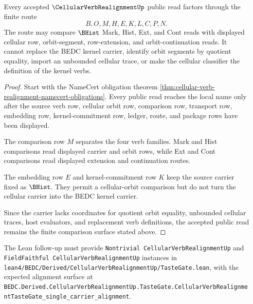\begin{theorem}
\label{thm:cellular-verb-realignment-non-escape-boundary}
Every accepted $\CellularVerbRealignmentUp$ public read factors through the finite route
$$
B,O,M,H,E,K,L,C,P,N.
$$
The route may compare $\BHist$ Mark, Hist, Ext, and Cont reads with displayed cellular row, orbit-segment, row-extension, and orbit-continuation reads. It cannot replace the BEDC kernel carrier, identify orbit segments by quotient equality, import an unbounded cellular trace, or make the cellular classifier the definition of the kernel verbs.
\end{theorem}
\begin{proof}
Start with the NameCert obligation theorem \autoref{thm:cellular-verb-realignment-namecert-obligations}. Every public read reaches the local name only after the source verb row, cellular orbit row, comparison row, transport row, embedding row, kernel-commitment row, ledger, route, and package rows have been displayed.

The comparison row $M$ separates the four verb families. Mark and Hist comparisons read displayed carrier and orbit rows, while Ext and Cont comparisons read displayed extension and continuation routes.

The embedding row $E$ and kernel-commitment row $K$ keep the source carrier fixed as $\BHist$. They permit a cellular-orbit comparison but do not turn the cellular carrier into the BEDC kernel carrier.

Since the carrier lacks coordinates for quotient orbit equality, unbounded cellular traces, host evaluators, and replacement verb definitions, the accepted public read remains the finite comparison surface stated above.
\end{proof}

The Lean follow-up must provide \texttt{Nontrivial CellularVerbRealignmentUp} and \texttt{FieldFaithful CellularVerbRealignmentUp} instances in \texttt{lean4/BEDC/Derived/CellularVerbRealignmentUp/TasteGate.lean}, with the expected alignment surface at \texttt{BEDC.Derived.CellularVerbRealignmentUp.TasteGate.CellularVerbRealignmentTasteGate\_single\_carrier\_alignment}.


